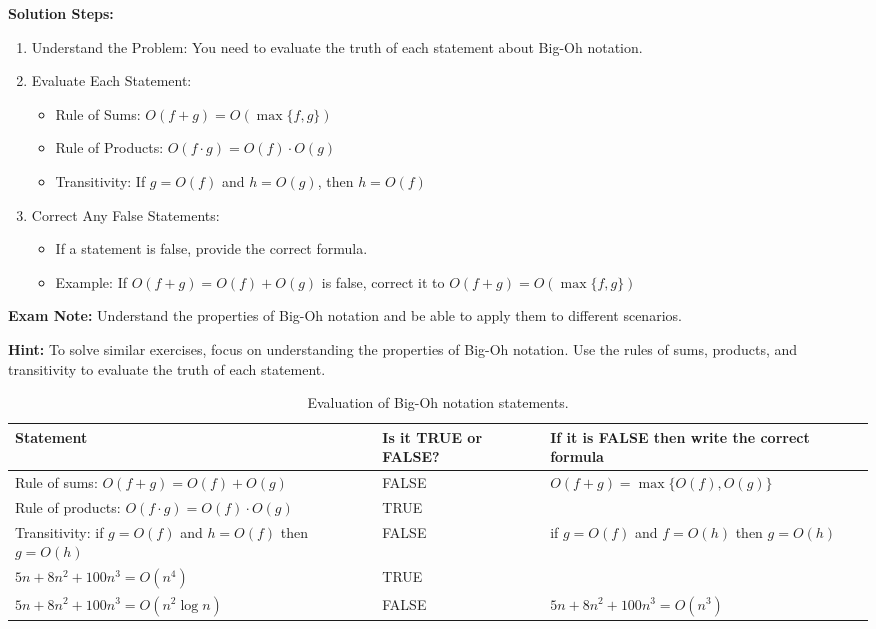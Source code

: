 \vspace{0.5em}
\textbf{Solution Steps:}
\begin{enumerate}[leftmargin=*,noitemsep]
    \item Understand the Problem: You need to evaluate the truth of each statement about Big-Oh notation.
    \item Evaluate Each Statement:
    \begin{itemize}
        \item Rule of Sums: $O(f + g) = O(\max\{f, g\})$
        \item Rule of Products: $O(f \cdot g) = O(f) \cdot O(g)$
        \item Transitivity: If $g = O(f)$ and $h = O(g)$, then $h = O(f)$
    \end{itemize}
    \item Correct Any False Statements:
    \begin{itemize}
        \item If a statement is false, provide the correct formula.
        \item Example: If $O(f + g) = O(f) + O(g)$ is false, correct it to $O(f + g) = O(\max\{f, g\})$
    \end{itemize}
\end{enumerate}

\textbf{Exam Note:} Understand the properties of Big-Oh notation and be able to apply them to different scenarios.

\textbf{Hint:} To solve similar exercises, focus on understanding the properties of Big-Oh notation. Use the rules of sums, products, and transitivity to evaluate the truth of each statement.

\begin{table}[h]
    \centering
    \small
    \begin{tabularx}{\linewidth}{|X|X|X|}
        \hline
        Statement & Is it TRUE or FALSE? & If it is FALSE then write the correct formula \\
        \hline
        Rule of sums: $O(f + g) = O(f) + O(g)$ & FALSE & $O(f + g) = \max\{O(f), O(g)\}$ \\
        \hline
        Rule of products: $O(f \cdot g) = O(f) \cdot O(g)$ & TRUE & \\
        \hline
        Transitivity: if $g = O(f)$ and $h = O(f)$ then $g = O(h)$ & FALSE & if $g = O(f)$ and $f = O(h)$ then $g = O(h)$ \\
        \hline
        $5n + 8n^2 + 100n^3 = O(n^4)$ & TRUE & \\
        \hline
        $5n + 8n^2 + 100n^3 = O(n^2 \log n)$ & FALSE & $5n + 8n^2 + 100n^3 = O(n^3)$ \\
        \hline
    \end{tabularx}
    \caption{Evaluation of Big-Oh notation statements.}
\end{table}

